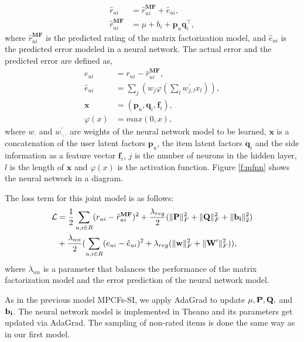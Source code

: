 \begin{align}
	\hat{r}_{ui} &= \hat{r}_{ui}^\mathbf{MF} + \hat{e}_{ui},\\
	\hat{r}_{ui}^\mathbf{MF} &= \mu + b_i + \textbf{p}_u \textbf{q}_i^\intercal,
\end{align}
where $\hat{r}_{ui}^\mathbf{MF}$ is the predicted rating of the matrix factorization model, and $\hat{e}_{ui}$ is the predicted error modeled in a neural network.
The actual error and the predicted error are defined as,
\begin{align}
	e_{ui} &= r_{ui} - \hat{r}_{ui}^\mathbf{MF}, \\
	\hat{e}_{ui} &= \sum_j (w_{j} \varphi(\sum_l^{} w^\prime_{j,l} x_l)),\\
	\mathbf{x} &= (\mathbf{p}_u, \mathbf{q}_i, \mathbf{f}_i), \\
	\varphi(x) &= max(0, x),
\end{align}
where $w_{\cdot}$ and $w_{\cdot,\cdot}^\prime$ are weights of the neural network model to be learned, $\mathbf{x}$ is a concatenation of the user latent factors $\mathbf{p}_u$, the item latent factors $\mathbf{q}_i$ and the side information as a feature vector $\mathbf{f}_i$, $j$ is the number of neurons in the hidden layer, $l$ is the length of $\mathbf{x}$ and $\varphi(x)$ is the activation function.
Figure \ref{f:mfnn} shows the neural network in a diagram.

The loss term for this joint model is as follows:
\begin{equation}
\begin{aligned}
\mathcal{L} &= \frac{1}{2} \sum_{u,i \in R} (r_{ui} - \hat{r}_{ui}^\mathbf{MF})^2 + \frac{\lambda_{reg}}{2} (\lVert{\ensuremath{\mathbf{P}}}\rVert_F^2 + \lVert{\ensuremath{\mathbf{Q}}}\rVert_F^2 + \lVert{\ensuremath{\mathbf{b_i}}}\rVert_2^2) \\
& + \frac{\lambda_{nn}}{2} (\sum_{u,i \in R} (e_{ui} - \hat{e}_{ui})^2 + \lambda_{reg} (\lVert{\ensuremath{\mathbf{w}}}\rVert_F^2 + \lVert{\ensuremath{\mathbf{W^\prime}}}\rVert_F^2)),
\end{aligned}
\end{equation}
where $\lambda_{nn}$ is a parameter that balances the performance of the matrix factorization model and the error prediction of the neural network model.

As in the previous model MPCFs-SI, we apply AdaGrad to update $\mu, \mathbf{P}, \mathbf{Q},$ and $\mathbf{b_i}$.
The neural network model is implemented in Theano and its parameters get updated via AdaGrad.
The sampling of non-rated items is done the same way as in our first model.

